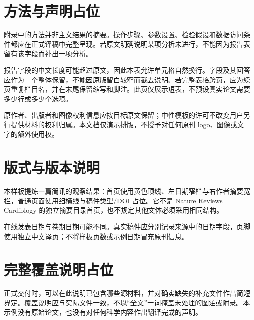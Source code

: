 \documentclass[UTF8,fontset=none,twocolumn,scheme=plain]{ctexart}
\begin{document}
\section*{方法与声明占位}
附录中的方法并非主文结果的摘要。操作步骤、参数设置、检验假设和数据访问条件都应在正式译稿中完整呈现。若原文明确说明某项分析未进行，不能因为报告表留有该字段而补出一项分析。\par
报告字段的中文长度可能超过原文，因此本表允许单元格自然换行。字段及其回答应作为一个整体保留，不能因原版留白较窄而截去说明。若完整表格跨页，应为续页重复栏目名，并在末尾保留缩写和脚注。此页仅展示短表，不预设真实论文需要多少行或多少个选项。\par
原作者、出版者和图像权利信息应按目标原文保留；中性模板的许可不改变用户另行提供材料的权利归属。本文档仅演示排版，不授予对任何原刊 logo、图像或文字的额外使用权。\par
\section*{版式与版本说明}
本样板提炼一篇简讯的观察结果：首页使用黄色顶线、左日期窄栏与右作者摘要宽栏，普通页面使用细横线与稿件类型/DOI 占位。它不是 Nature Reviews Cardiology 的独立摘要目录首页，也不规定其他文体必须采用相同结构。\par
\begin{samepage}在线发表日期与卷期日期可能不同。真实稿件应分别记录来源中的日期字段，页脚使用独立中文译页；不将样板页数或示例日期冒充原刊信息。\par\end{samepage}
\section*{完整覆盖说明占位}
正式交付时，可以在此说明已包含哪些源材料，并对确实缺失的补充文件作出简短界定。覆盖说明应与实际文件一致，不以“全文”一词掩盖未处理的图注或附录。本示例没有原始论文，也没有对任何科学内容作出翻译完成的声明。\par
\SampleBibliography
\SampleSourceInfo
\end{document}
